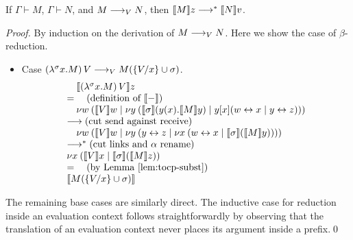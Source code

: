 \documentclass[orivec,envcountsame]{llncs}
\begin{document}

\begin{theorem}
If $\Gamma \vdash M$, $\Gamma \vdash N$, and $M \teval N$, then $\tocp{M}z
\rto^* \tocp{N}v$.
\end{theorem}
%
\begin{proof}
By induction on the derivation of $M \teval N$. Here we show the case of $\beta$-reduction.
\begin{itemize}
\item Case $(\lambda^\sigma x.M)\,V \teval M(\{\bind x V\} \cup \sigma)$.
\[
\bl
\quad \tocp{(\lambda^\sigma x.M)\,V}z \\
= \quad (\text{definition of }\tocp{-}) \\
\quad \cut{w}{}{\tocp{V}w}{\cut{y}{}{\tocp{\sigma}(y(x).\tocp{M}y)}{y[x](\link{w}{x} \mid \link{y}{z})}} \\
\rto (\text{cut send against receive}) \\
\quad \cut{w}{}{\tocp{V}w}{\cut{y}{}{\link{y}{z}}{\cut{x}{}{\link{w}{x}}{\tocp{\sigma}(\tocp{M}y)}}} \\
\rto^* (\text{cut links and $\alpha$ rename}) \\
\cut{x}{}{\tocp{V}x}{\tocp{\sigma}(\tocp{M}z)} \\
= \quad (\text{by Lemma~\ref{lem:tocp-subst}}) \\
\tocp{M(\{\bind x V\} \cup \sigma)}
\el
\]
\end{itemize}
The remaining base cases are similarly direct. The inductive case for reduction inside an evaluation
context follows straightforwardly by observing that the translation of an evaluation context never
places its argument inside a prefix.\qed
\end{proof}
\end{document}
